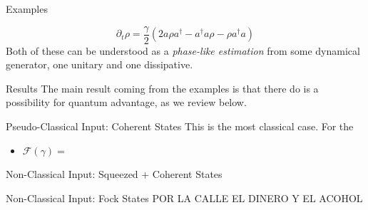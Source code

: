 \documentclass[final]{beamer}
\newlength{\colwidth}
\begin{document}
\begin{frame}[t]
\begin{columns}[t]
\begin{column}{\colwidth}


\begin{block}{Examples}
     \vspace{-0.01\linewidth}
     
     \vspace{-0.07\linewidth}
     \vspace{-0.07\linewidth}
  {\Large
    \begin{equation*}
      \partial_{t}\rho = \frac{\gamma}{2}(2a\rho a^{\dagger}-a^{\dagger}a\rho - \rho a^{\dagger}a)
    \end{equation*}
}
Both of these can be understood as a \textit{phase-like estimation} from some dynamical generator, one unitary and one dissipative.
\end{block}

   \begin{block}{Results}
     The main result coming from the examples is that there do is
     a possibility for quantum advantage, as we review below.
  \end{block}


  \begin{exampleblock}{Pseudo-Classical Input: Coherent States}
    This is the most classical case. For the
\begin{itemize}
        \item $\mathcal{F}(\gamma) = $
\end{itemize}
  \end{exampleblock}


  \begin{exampleblock}{Non-Classical Input: Squeezed + Coherent States}

  \end{exampleblock}


  \begin{exampleblock}{Non-Classical Input: Fock States}
POR LA CALLE EL DINERO Y EL ACOHOL
  \end{exampleblock}


\end{column}
\end{columns}
\end{frame}
\end{document}
